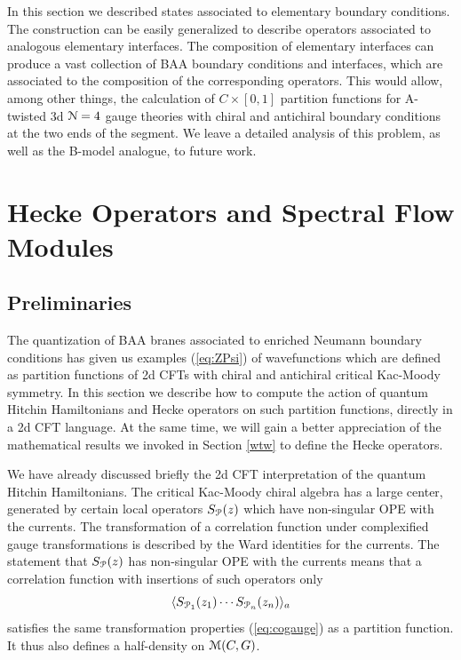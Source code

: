 \documentclass[11pt,a4paper]{article}
\begin{document}
In this section we described states associated to elementary boundary conditions. The construction can be easily generalized to describe operators associated to analogous elementary interfaces. The composition of elementary interfaces can produce a vast collection of BAA boundary conditions and interfaces, which are associated to the composition of the corresponding operators. This would allow, among other things, the calculation of $C \times [0,1]$ partition functions for A-twisted 3d ${\cal N}=4$ gauge theories with chiral and antichiral boundary conditions at the two ends of the segment. We leave a detailed analysis of this problem, as well as the B-model analogue, 
to future work. 


\section{Hecke Operators and Spectral Flow Modules}\label{sec:chiral}

\subsection{Preliminaries}

The quantization of BAA branes associated to enriched Neumann boundary conditions has given us examples (\ref{eq:ZPsi}) of wavefunctions which are defined as partition functions of 2d CFTs with chiral and antichiral critical Kac-Moody symmetry. In this section we describe how to compute the action of quantum Hitchin Hamiltonians and Hecke operators on such partition functions, directly in a 2d CFT language. At the same time, we will gain a better appreciation of the mathematical results we invoked in Section \ref{wtw} to define the Hecke operators.

We have already discussed briefly the 2d CFT interpretation of the quantum Hitchin Hamiltonians. The critical Kac-Moody chiral algebra 
has a large center, generated by certain local operators $S_{\cal P}(z)$ which have non-singular OPE with the currents.  
The transformation of a correlation function under complexified gauge transformations is described
by the Ward identities for the currents.
The statement that $S_{\cal P}(z)$ has non-singular OPE with the currents means that a correlation function with insertions of such operators only
\begin{equation}
\langle S_{{\cal P}_1}(z_1) \cdots S_{{\cal P}_n}(z_n) \rangle_a
\end{equation}
satisfies  the same transformation properties (\ref{eq:cogauge}) as a partition function. It thus also defines a half-density on ${\mathcal M}(C,G)$. 
\end{document}
